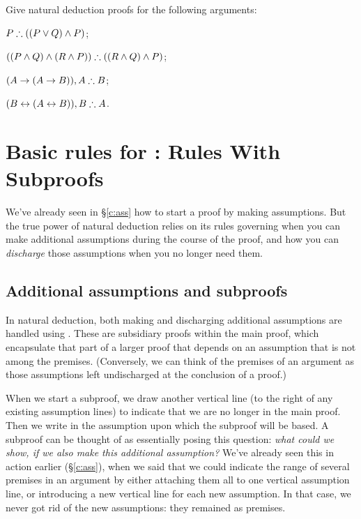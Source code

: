 \problempart
Give natural deduction proofs for the following arguments: \begin{earg}
	\item $P \mathrel{\therefore} ((P \vee Q) \wedge P)$;
	\item $((P \wedge Q) \wedge (R \wedge P)) \mathrel{\therefore} ((R \wedge Q) \wedge P)$;
	\item $(A \rightarrow (A \rightarrow B)), A \mathrel{\therefore} B$;
	\item $(B \leftrightarrow (A \leftrightarrow B)), B \mathrel{\therefore} A$.
\end{earg}



\chapter{Basic rules for \textnormal{\TFL}: Rules With Subproofs}\label{s:BasicTFLs}

We've already seen in §\ref{c:ass} how to start a proof by making assumptions. But the true power of natural deduction relies on its rules governing when you can make additional assumptions during the course of the proof, and how you can \emph{discharge} those assumptions when you no longer need them. 


\section{Additional assumptions and subproofs}\label{s.subproof}

In natural deduction, both making and discharging additional assumptions are handled using . These are subsidiary proofs within the main proof, which encapsulate that part of a larger proof that depends on an assumption that is not among the premises. (Conversely, we can think of the premises of an argument as those assumptions left undischarged at the conclusion of a proof.)

When we start a subproof, we draw another vertical line (to the right of any existing assumption lines) to indicate that we are no longer in the main proof. Then we write in the assumption upon which the subproof will be based. A subproof can be thought of as essentially posing this question: \emph{what could we show, if we also make this additional assumption?} We've already seen this in action earlier (§\ref{c:ass}), when we said that we could indicate the range of several premises in an argument by either attaching them all to one vertical assumption line, or introducing a new vertical line for each new assumption. In that case, we never got rid of the new assumptions: they remained as premises. 

